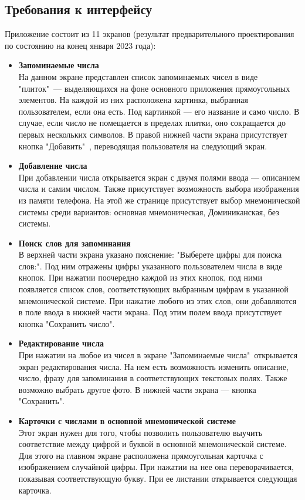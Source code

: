 \documentclass[draft]{article}
\begin{document}
\subsection{Требования к интерфейсу}
Приложение состоит из 11 экранов (результат предварительного проектирования по состоянию на конец января 2023 года):
\begin{itemize}
\item \textbf{Запоминаемые числа}\\
На данном экране представлен список запоминаемых чисел в виде "{}плиток"{}\ — выделяющихся на фоне основного приложения прямоугольных элементов. На каждой из них расположена картинка, выбранная пользователем, если она есть. Под картинкой — его название и само число. В случае, если число не помещается в пределах плитки, оно сокращается до первых нескольких символов. В правой нижней части экрана присутствует кнопка "{}Добавить"{}\ , переводящая пользователя на следующий экран.
\item \textbf{Добавление числа}\\
При добавлении числа открывается экран с двумя полями ввода — описанием числа и самим числом. Также присутствует возможность выбора изображения из памяти телефона. На этой же странице присутствует выбор мнемонической системы среди вариантов: основная мнемоническая, Доминиканская, без системы.
\item \textbf{Поиск слов для запоминания}\\
В верхней части экрана указано пояснение: "{}Выберете цифры для поиска слов:"{}. Под ним отражены цифры указанного пользователем числа в виде кнопок. При нажатии поочередно каждой из этих кнопок, под ними появляется список слов, соответствующих выбранным цифрам в указанной мнемонической системе. При нажатие любого из этих слов, они добавляются в поле ввода в нижней части экрана. Под этим полем ввода присутствует кнопка "{}Сохранить число"{}.
\item \textbf{Редактирование числа}\\
При нажатии на любое из чисел в экране "{}Запоминаемые числа"{}\ открывается экран редактирования числа. На нем есть возможность изменить описание, число, фразу для запоминания в соответствующих текстовых полях. Также возможно выбрать другое фото. В нижней части экрана — кнопка "{}Сохранить"{}.
\item \textbf{Карточки с числами в основной мнемонической системе}\\
Этот экран нужен для того, чтобы позволить пользователю выучить соответствие между цифрой и буквой в основной мнемонической системе. Для этого на главном экране расположена прямоугольная карточка с изображением случайной цифры. При нажатии на нее она переворачивается, показывая соответствующую букву. При ее листании открывается следующая карточка.

\end{itemize}
\end{document}
